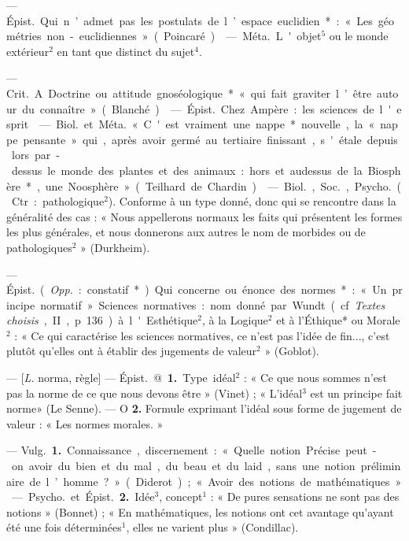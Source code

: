 \begin{itemize}[leftmargin=1cm, label=, itemsep=1pt]
 — \si{Épist.} Qui n’admet
pas les postulats de l’espace euclidien* : « Les géométries non-euclidiennes » (Poincaré).

 — \si{Méta.} L'objet$^5$ ou le
monde extérieur$^2$ en tant que distinct du sujet$^4$.

 — \si{Crit.} A. Doctrine ou
attitude gnoséologique* « qui fait
graviter l’être autour du connaître»
(Blanché).

 — \si{Épist.} Chez
Ampère : les sciences de l'esprit.

 — \si{Biol.} et \si{Méta.} « C'est
vraiment une nappe* nouvelle, la
« nappe pensante » qui, après avoir
germé au tertiaire finissant, s'étale
depuis lors par-dessus le monde des
plantes et des animaux : hors et audessus de la Biosphère*, une Noosphère » (Teilhard de Chardin).

 — \si{Biol.}, \si{Soc.}, \si{Psycho.} (Ctr. :
pathologique$^2$). Conforme à un type
donné, donc qui se rencontre dans
la généralité des cas : « Nous appellerons normaux les faits qui présentent les formes les plus générales,
et nous donnerons aux autres le
nom de morbides ou de pathologiques$^2$ » (Durkheim).

 — \si{Épist.} ({\it Opp.} : constatif*)
Qui concerne ou énonce des normes*:
« Un principe normatif ». Sciences
normatives : nom donné par Wundt
(cf. {\it Textes choisis}, II, p. 136) à
l'Esthétique$^2$, à la Logique$^2$ et à
l'Éthique* ou Morale$^2$ : « Ce qui
caractérise les sciences normatives,
ce n’est pas l'idée de fin..., c’est
plutôt qu’elles ont à établir des jugements de valeur$^2$ » (Goblot).

 — [{\it L.} norma, règle] — \si{Épist.}
@ {\bf 1.} Type idéal$^2$ : « Ce que nous
sommes n’est pas la norme de ce
que nous devons être » (Vinet) ;
« L'idéal$^3$ est un principe fait norme»
(Le Senne). — O {\bf 2.} Formule exprimant l'idéal sous forme de jugement de valeur : « Les normes morales. »

 — \si{Vulg.} {\bf 1.} Connaissance, discernement : « Quelle notion Précise
peut-on avoir du bien et du mal,
du beau et du laid, ... sans une notion préliminaire de l’homme ? »
(Diderot) ; « Avoir des notions de
mathématiques. »

— \si{Psycho.} et \si{Épist.} {\bf 2.} Idée$^3$,
concept$^1$ : « De pures sensations ne
sont pas des notions » (Bonnet) ;
« En mathématiques, les notions
ont cet avantage qu'ayant été une
fois déterminées$^1$, elles ne varient
plus » (Condillac).


\end{itemize}
